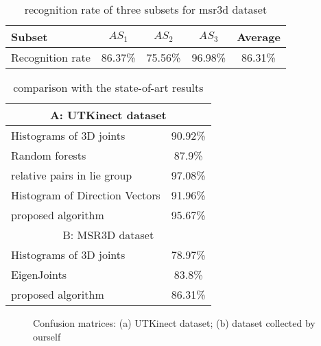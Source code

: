 \documentclass[conference]{IEEEtran}
\begin{document}
			\begin{table}[htbp]
				\caption{recognition rate of three subsets for msr3d dataset}
				\label{tab:MSR3D}
				\begin{center}
					\begin{tabular}{|l|c|c|c|c|} \hline
						Subset       & $AS_{1}$   & $AS_{2}$ & $AS_{3}$ & Average \\\hline
						Recognition rate & 86.37\% & 75.56\% & 96.98\% & 86.31\% \\\hline
					\end{tabular}
				\end{center}
			\end{table}
			\begin{table}[htbp]
				\caption{comparison with the state-of-art results}
				\label{tab:utkinect and msr3d results comparation}
				\begin{center}
					\begin{tabular}{|l|c|} \hline
						\multicolumn{2}{|c|}{A: UTKinect dataset \cite{hostogram_of_3d_joints}} \\\hline
						Histograms of 3D joints \cite{hostogram_of_3d_joints} & 90.92\% \\\hline
						Random forests \cite{Fusing_spatiotemporal_features_and_joints} & 87.9\% \\\hline
						relative pairs in lie group \cite{lie_group} & 97.08\% \\\hline
						Histogram of Direction Vectors \cite{natural_human_robot}& 91.96\% \\\hline
						proposed algorithm & 95.67\% \\\hline
						\hline
						\multicolumn{2}{|c|}{B: MSR3D dataset \cite{MSR3D_dataset}} \\\hline
						Histograms of 3D joints \cite{hostogram_of_3d_joints} & 78.97\% \\\hline
						EigenJoints \cite{Eigenjoints} & 83.8\% \\\hline
						proposed algorithm & 86.31\% \\\hline
					\end{tabular}
				\end{center}
			\end{table}
			\begin{figure}[h]
				\centering
				\vfill
				\centering
				\vfill
				\centering
				\caption{Confusion matrices: (a) UTKinect dataset; (b) dataset collected by ourself}
			\end{figure}
\end{document}
